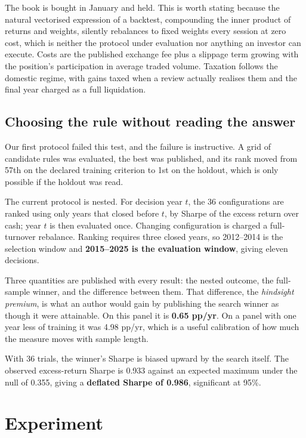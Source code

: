 \documentclass[10pt,conference]{IEEEtran}
\begin{document}
The book is bought in January and held. This is worth stating because the natural vectorised expression of a backtest, compounding the inner product of returns and weights, silently rebalances to fixed weights every session at zero cost, which is neither the protocol under evaluation nor anything an investor can execute. Costs are the published exchange fee plus a slippage term growing with the position's participation in average traded volume. Taxation follows the domestic regime, with gains taxed when a review actually realises them and the final year charged as a full liquidation.

\subsection{Choosing the rule without reading the answer}

Our first protocol failed this test, and the failure is instructive. A grid of candidate rules was evaluated, the best was published, and its rank moved from 57th on the declared training criterion to 1st on the holdout, which is only possible if the holdout was read.

The current protocol is nested. For decision year $t$, the 36 configurations are ranked using only years that closed before $t$, by Sharpe of the excess return over cash; year $t$ is then evaluated once. Changing configuration is charged a full-turnover rebalance. Ranking requires three closed years, so 2012--2014 is the selection window and \textbf{2015--2025 is the evaluation window}, giving eleven decisions.

Three quantities are published with every result: the nested outcome, the full-sample winner, and the difference between them. That difference, the \emph{hindsight premium}, is what an author would gain by publishing the search winner as though it were attainable. On this panel it is \textbf{0.65 pp/yr}. On a panel with one year less of training it was 4.98 pp/yr, which is a useful calibration of how much the measure moves with sample length.

With 36 trials, the winner's Sharpe is biased upward by the search itself. The observed excess-return Sharpe is 0.933 against an expected maximum under the null of 0.355, giving a \textbf{deflated Sharpe of 0.986}, significant at 95\%.

\section{Experiment}
\end{document}
